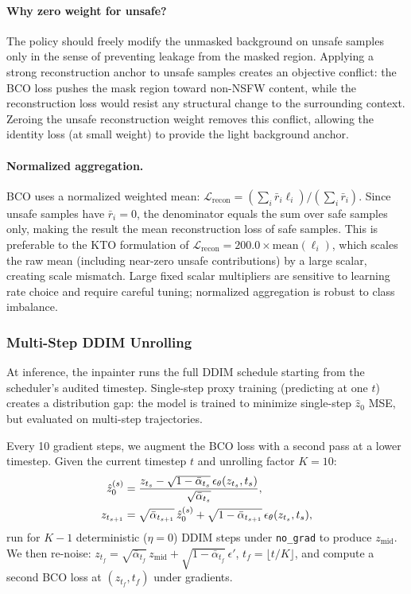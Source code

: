 \paragraph{Why zero weight for unsafe?}
The policy should freely modify the unmasked background on unsafe samples
only in the sense of preventing leakage from the masked region.
Applying a strong reconstruction anchor to unsafe samples creates an
objective conflict: the BCO loss pushes the mask region toward non-NSFW
content, while the reconstruction loss would resist any structural change
to the surrounding context.
Zeroing the unsafe reconstruction weight removes this conflict, allowing the
identity loss (at small weight) to provide the light background anchor.

\paragraph{Normalized aggregation.}
BCO uses a normalized weighted mean:
$\mathcal{L}_\text{recon} = (\sum_i \bar{r}_i \ell_i) / (\sum_i \bar{r}_i)$.
Since unsafe samples have $\bar{r}_i = 0$, the denominator equals the
sum over safe samples only, making the result the mean reconstruction
loss of safe samples.
This is preferable to the KTO formulation of
$\mathcal{L}_\text{recon} = 200.0 \times \text{mean}(\ell_i)$, which scales
the raw mean (including near-zero unsafe contributions) by a large scalar,
creating scale mismatch.
Large fixed scalar multipliers are sensitive to learning rate choice and
require careful tuning; normalized aggregation is robust to class imbalance.

\subsubsection{Multi-Step DDIM Unrolling}

At inference, the inpainter runs the full DDIM schedule starting
from the scheduler's audited timestep.
Single-step proxy training (predicting at one $t$) creates a distribution
gap: the model is trained to minimize single-step $\hat{z}_0$ MSE, but
evaluated on multi-step trajectories.

Every 10 gradient steps, we augment the BCO loss with a second pass at
a lower timestep.
Given the current timestep $t$ and unrolling factor $K=10$:
\begin{align}
  \hat{z}_0^{(s)} &= \frac{z_{t_s} - \sqrt{1-\bar\alpha_{t_s}}\,
    \epsilon_\theta(z_{t_s}, t_s)}{\sqrt{\bar\alpha_{t_s}}},
    \notag\label{eq:ddim_z0} \\
  z_{t_{s+1}} &= \sqrt{\bar\alpha_{t_{s+1}}}\,\hat{z}_0^{(s)}
    + \sqrt{1-\bar\alpha_{t_{s+1}}}\,\epsilon_\theta(z_{t_s}, t_s),\notag
\end{align}
run for $K-1$ deterministic ($\eta=0$) DDIM steps under \texttt{no\_grad}
to produce $z_\text{mid}$.
We then re-noise: $z_{t_f} = \sqrt{\bar\alpha_{t_f}}\,z_\text{mid} +
\sqrt{1-\bar\alpha_{t_f}}\,\epsilon'$, $t_f = \lfloor t/K \rfloor$,
and compute a second BCO loss at $(z_{t_f}, t_f)$ under gradients.

